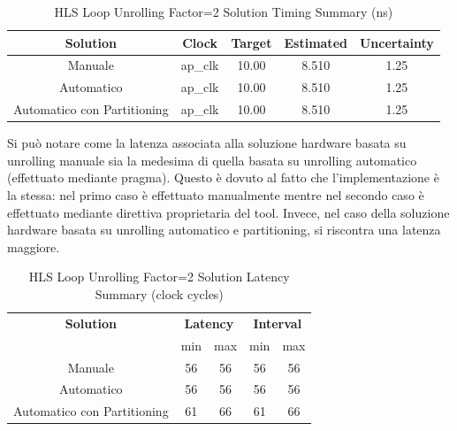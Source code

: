 



\begin{table}[H]
    \centering
    \begin{tabular}{|c|c|c|c|c|}
        \hline
        \textbf{Solution} & \textbf{Clock} & \textbf{Target} & \textbf{Estimated} & \textbf{Uncertainty} \\
        \hline
        Manuale & ap\_clk & 10.00 & 8.510 & 1.25 \\
        \hline
        Automatico & ap\_clk & 10.00 & 8.510 & 1.25 \\
        \hline
        Automatico con Partitioning & ap\_clk & 10.00 & 8.510 & 1.25 \\
        \hline
    \end{tabular}
    \caption{HLS Loop Unrolling Factor=2 Solution Timing Summary (ns)}
    \label{tab:hls-loop-unrolling-factor2-solution-timing-summary}
\end{table}

Si può notare come la latenza associata alla soluzione hardware basata su unrolling manuale sia la medesima di quella basata su unrolling automatico (effettuato mediante pragma). Questo è dovuto al fatto che l'implementazione è la stessa: nel primo caso è effettuato manualmente mentre nel secondo caso è effettuato mediante direttiva proprietaria del tool. Invece, nel caso della soluzione hardware basata su unrolling automatico e partitioning, si riscontra una latenza maggiore.

\begin{table}[H]
    \centering
    \begin{tabular}{|c|c|c|c|c|}
        \hline
        \multicolumn{1}{|c|}{\textbf{Solution}} & \multicolumn{2}{|c|}{\textbf{Latency}} & \multicolumn{2}{|c|}{\textbf{Interval}} \\
        & min & max & min & max \\
        \hline
        Manuale & 56 & 56 & 56 & 56 \\
        \hline
        Automatico & 56 & 56 & 56 & 56 \\
        \hline
        Automatico con Partitioning & 61 & 66 & 61 & 66 \\
        \hline
    \end{tabular}
    \caption{HLS Loop Unrolling Factor=2 Solution Latency Summary (clock cycles)}
    \label{tab:hls-loop-unrolling-factor2-solution-latency-summary}
\end{table}

